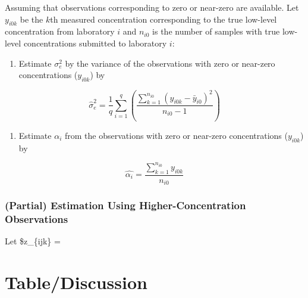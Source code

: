 \documentclass[12pt,]{article}
\providecommand{\tightlist}{%
  \setlength{\itemsep}{0pt}\setlength{\parskip}{0pt}}
\begin{document}
Assuming that observations corresponding to zero or near-zero are
available. Let \(y_{i0k}\) be the \(k\)th measured concentration
corresponding to the true low-level concentration from laboratory \(i\)
and \(n_{i0}\) is the number of samples with true low-level
concentrations submitted to laboratory \(i\):

\begin{enumerate}
\def\labelenumi{(\arabic{enumi})}
\tightlist
\item
  Estimate \(\sigma_e^2\) by the variance of the observations with zero
  or near-zero concentrations (\(y_{i0k}\)) by
\end{enumerate}

\begin{equation}
\hat{\sigma}_e^2 = \frac{1}{q} \displaystyle \sum_{i = 1}^{q} (\frac{\sum_{k=1}^{n_{i0}}(y_{i0k}-\bar{y}_{i0})^2}{n_{i0}-1})
\end{equation}

\begin{enumerate}
\def\labelenumi{(\arabic{enumi})}
\setcounter{enumi}{1}
\tightlist
\item
  Estimate \(\alpha_i\) from the observations with zero or near-zero
  concentrations (\(y_{i0k}\)) by
\end{enumerate}

\begin{equation}
\hat{\alpha_i} = \frac{\sum_{k=1}^{n_{i0}}y_{i0k}}{n_{i0}}
\end{equation}

\subsubsection{(Partial) Estimation Using Higher-Concentration
Observations}\label{partial-estimation-using-higher-concentration-observations}

Let \$z\_\{ijk\} = 

\section{Table/Discussion}\label{tablediscussion}

\renewcommand\refname{References}

\end{document}
